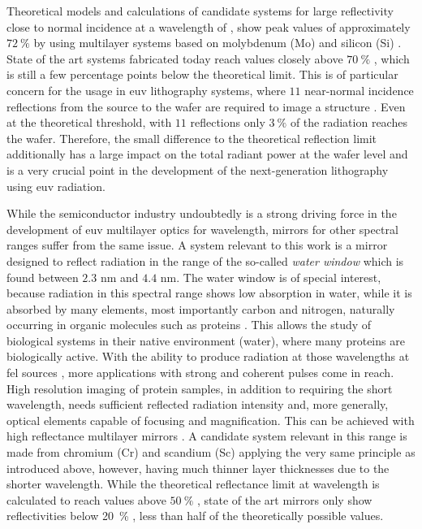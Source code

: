 Theoretical models and calculations of candidate systems for large reflectivity close to normal incidence at a wavelength of , show peak values of approximately $\SI{72}{\percent}$ by using multilayer systems based on molybdenum (Mo) and silicon (Si) \cite{barbee_jr._multi-spectral_1991,finkenthal_near_1990, barbee_molybdenum-silicon_1985}. State of the art systems fabricated today reach values closely above $\SI{70}{\percent}$ \cite{martinez-galarce_high_2000,bajt_improved_2002,braun_grenzflachen-optimierte_2003, braun_mo/si_2002, feigl_euv_2006}, which is still a few percentage points below the theoretical limit. This is of particular concern for the usage in \gls{euv} lithography systems, where $11$ near-normal incidence reflections from the source to the wafer are required to image a structure \cite{kaiser_euvl_2008, wagner_euv_2010}. Even at the theoretical threshold, with $11$ reflections only $\SI{3}{\percent}$ of the radiation reaches the wafer. Therefore, the small difference to the theoretical reflection limit additionally has a large impact on the total radiant power at the wafer level and is a very crucial point in the development of the next-generation lithography using \gls{euv} radiation. 

While the semiconductor industry undoubtedly is a strong driving force in the development of \gls{euv} multilayer optics for  wavelength, mirrors for other spectral ranges suffer from the same issue. A system relevant to this work is a mirror designed to reflect radiation in the range of the so-called \emph{water window} which is found between $2.3$ nm and $4.4$ nm. The water window is of special interest, because radiation in this spectral range shows low absorption in water, while it is absorbed by many elements, most importantly carbon and nitrogen, naturally occurring in organic molecules such as proteins \cite{kirz_soft_1995}. This allows the study of biological systems in their native environment (water), where many proteins are biologically active. With the ability to produce radiation at those wavelengths at \gls{fel} sources \cite{ackermann_operation_2007, schreiber_first_2011}, more applications with strong and coherent pulses come in reach. High resolution imaging of protein samples, in addition to requiring the short wavelength, needs sufficient reflected radiation intensity and, more generally, optical elements capable of focusing and magnification. This can be achieved with high reflectance multilayer mirrors \cite{hertz_normal-incidence_1999,legall_compact_2012}. A candidate system relevant in this range is made from chromium (Cr) and scandium (Sc) applying the very same principle as introduced above, however, having much thinner layer thicknesses due to the shorter wavelength. While the theoretical reflectance limit at  wavelength is calculated to reach values above $\SI{50}{\percent}$ \cite{schafers_cr/sc_1998}, state of the art mirrors only show reflectivities below \SI{20}{\percent} \cite{eriksson_14.5_2003, yulin_high-performance_2004}, less than half of the theoretically possible values.

